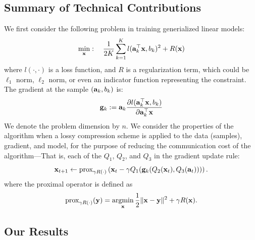 \documentclass{article}
\renewcommand{\vec}[1]{\mathbf{#1}}
\def\a{{\bf a}}
\def\g{{\bf g}}
\def\x{{\bf x}}
\def\y{{\bf y}}
\DeclareMathOperator*{\argmin}{argmin}
\begin{document}


\subsection*{Summary of Technical Contributions}

We first consider the following problem in training generialized linear models: 
\begin{align}
\min_{\x}:\quad {1\over 2K}\sum_{k=1}^K l(\a_k^\top \x, b_k)^2 + R(\x)
\label{eqn:leastsquares}
\end{align}
where $l(\cdot,\cdot)$ is a loss function, and $R$ is a regularization term, which could be $\ell_1$ norm, $\ell_2$ norm, or even an indicator function representing the constraint. 
The gradient at the sample $(\a_k, b_k)$ is: 
\[
\g_k := \a_k \frac{\partial l(\a_k^\top \x, b_k)}{\partial \a_k^\top \x} 
\]
We denote the problem dimension by $n$. 
We consider the properties of the algorithm when a lossy compression scheme is applied to the data (samples), 
gradient, and model, for the purpose of reducing the communication cost of the algorithm---That is, each of the $Q_1$, $Q_2$, and $Q_3$ in the gradient update rule:
\[
\x_{t + 1} \leftarrow \text{prox}_{\gamma R(\cdot)}\left(\x_t - \gamma Q_1(\g_k (Q_2(\x_t), Q_3(\vec{a}_t)))\right).
\]
where the proximal operator is defined as
\[
\text{prox}_{\gamma R(\cdot)}(\y) =\argmin_{\x} {1\over 2}\|\x-\y\|^2 + \gamma R(\x).
\]


\subsection{Our Results}
\end{document}
